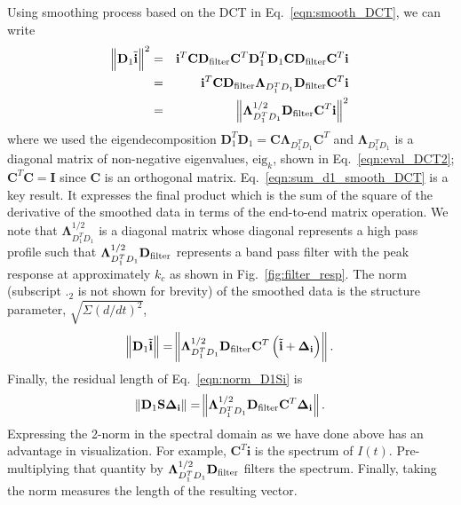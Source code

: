 \documentclass[twocolumn]{aastex631}
\begin{document}
Using smoothing process based on the DCT in Eq.~\eqref{eqn:smooth_DCT}, we can write
\begin{eqnarray}
\norm{\mathbf{D}_1\tilde{\mathbf{i}}}^2
&=&\mathbf{i}^T \mathbf{C}\mathbf{D}_{\rm filter}\mathbf{C}^T\mathbf{D}_1^T\mathbf{D}_1\mathbf{C}\mathbf{D}_{\rm filter}\mathbf{C}^T\mathbf{i} \nonumber \\
&=&\mathbf{i}^T\mathbf{C}\mathbf{D}_{\rm filter}\mathbf{\Lambda}_{D_1^TD_1}\mathbf{D}_{\rm filter}\mathbf{C}^T\mathbf{i} \nonumber\\
&=&\norm{\mathbf{\Lambda}_{D_1^TD_1}^{1/2}\mathbf{D}_{\rm filter}\mathbf{C}^T\mathbf{i}}^2
\label{eqn:sum_d1_smooth_DCT}
\end{eqnarray}
where we used the eigendecomposition $\mathbf{D}_1^T\mathbf{D}_1=\mathbf{C}\mathbf{\Lambda}_{D_1^TD_1}\mathbf{C}^T$ and $\mathbf{\Lambda}_{D_1^TD_1}$ is a diagonal matrix of non-negative eigenvalues, $\text{eig}_k$, shown in Eq.~\eqref{eqn:eval_DCT2}; $\mathbf{C}^T\mathbf{C}=\mathbf{I}$ since $\mathbf{C}$ is an orthogonal matrix. Eq.~\eqref{eqn:sum_d1_smooth_DCT} is a key result. It expresses the final product which is the sum of the square of the derivative of the smoothed data in terms of the end-to-end matrix operation. We note that $\mathbf{\Lambda}_{D_1^TD_1}^{1/2}$ is a diagonal matrix whose diagonal represents a high pass profile such that $\mathbf{\Lambda}_{D_1^TD_1}^{1/2}\mathbf{D}_{\rm filter}$ represents a band pass filter with the peak response at approximately $k_c$ as shown in Fig.~\ref{fig:filter_resp}. The norm (subscript $._2$ is not shown for brevity)  of the smoothed data is the structure parameter, $\sqrt{\Sigma(d/dt)^2}$,
\begin{eqnarray}
\norm{\mathbf{D}_1\tilde{\mathbf{i}}}=\norm{\mathbf{\Lambda}_{D_1^TD_1}^{1/2}\mathbf{D}_{\rm filter}\mathbf{C}^T\left(\tilde{\mathbf{i}}+\mathbf{\Delta_i}\right)}. 
\label{eqn:norm_res}
\end{eqnarray} 
Finally, the residual length of Eq.~\eqref{eqn:norm_D1Si} is 
\begin{eqnarray}
\norm{\mathbf{D}_1\mathbf{S}\mathbf{\Delta}_\mathbf{i}}=\norm{\mathbf{\Lambda}_{D_1^TD_1}^{1/2}\mathbf{D}_{\rm filter}\mathbf{C}^T\mathbf{\Delta_i}}.
\label{eqn:norm_del}
\end{eqnarray}
Expressing the 2-norm in the spectral domain as we have done above has an advantage in visualization. For example, $\mathbf{C}^T\mathbf{i}$ is the spectrum of $I(t)$. Pre-multiplying that quantity by $\mathbf{\Lambda}_{D_1^TD_1}^{1/2}\mathbf{D}_{\rm filter}$ filters the spectrum. Finally, taking the norm measures the length of the resulting vector.
\end{document}
